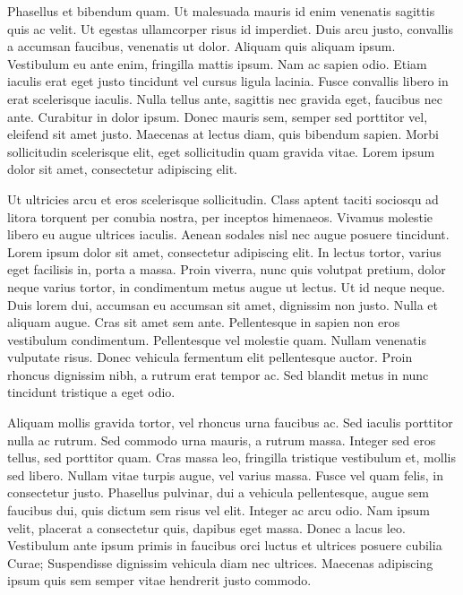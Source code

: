 Phasellus et bibendum quam.
Ut malesuada mauris id enim venenatis sagittis quis ac velit.
Ut egestas ullamcorper risus id imperdiet.
Duis arcu justo, convallis a accumsan faucibus, venenatis ut dolor.
Aliquam quis aliquam ipsum.
Vestibulum eu ante enim, fringilla mattis ipsum.
Nam ac sapien odio.
Etiam iaculis erat eget justo tincidunt vel cursus ligula lacinia.
Fusce convallis libero in erat scelerisque iaculis.
Nulla tellus ante, sagittis nec gravida eget, faucibus nec ante.
Curabitur in dolor ipsum.
Donec mauris sem, semper sed porttitor vel, eleifend sit amet justo.
Maecenas at lectus diam, quis bibendum sapien.
Morbi sollicitudin scelerisque elit, eget sollicitudin quam gravida vitae.
Lorem ipsum dolor sit amet, consectetur adipiscing elit.

Ut ultricies arcu et eros scelerisque sollicitudin.
Class aptent taciti sociosqu ad litora torquent per conubia nostra, per inceptos himenaeos.
Vivamus molestie libero eu augue ultrices iaculis.
Aenean sodales nisl nec augue posuere tincidunt.
Lorem ipsum dolor sit amet, consectetur adipiscing elit.
In lectus tortor, varius eget facilisis in, porta a massa.
Proin viverra, nunc quis volutpat pretium, dolor neque varius tortor, in condimentum metus augue ut lectus.
Ut id neque neque.
Duis lorem dui, accumsan eu accumsan sit amet, dignissim non justo.
Nulla et aliquam augue.
Cras sit amet sem ante.
Pellentesque in sapien non eros vestibulum condimentum.
Pellentesque vel molestie quam.
Nullam venenatis vulputate risus.
Donec vehicula fermentum elit pellentesque auctor.
Proin rhoncus dignissim nibh, a rutrum erat tempor ac.
Sed blandit metus in nunc tincidunt tristique a eget odio.

Aliquam mollis gravida tortor, vel rhoncus urna faucibus ac.
Sed iaculis porttitor nulla ac rutrum.
Sed commodo urna mauris, a rutrum massa.
Integer sed eros tellus, sed porttitor quam.
Cras massa leo, fringilla tristique vestibulum et, mollis sed libero.
Nullam vitae turpis augue, vel varius massa.
Fusce vel quam felis, in consectetur justo.
Phasellus pulvinar, dui a vehicula pellentesque, augue sem faucibus dui, quis dictum sem risus vel elit.
Integer ac arcu odio.
Nam ipsum velit, placerat a consectetur quis, dapibus eget massa.
Donec a lacus leo.
Vestibulum ante ipsum primis in faucibus orci luctus et ultrices posuere cubilia Curae; Suspendisse dignissim vehicula diam nec ultrices.
Maecenas adipiscing ipsum quis sem semper vitae hendrerit justo commodo.

